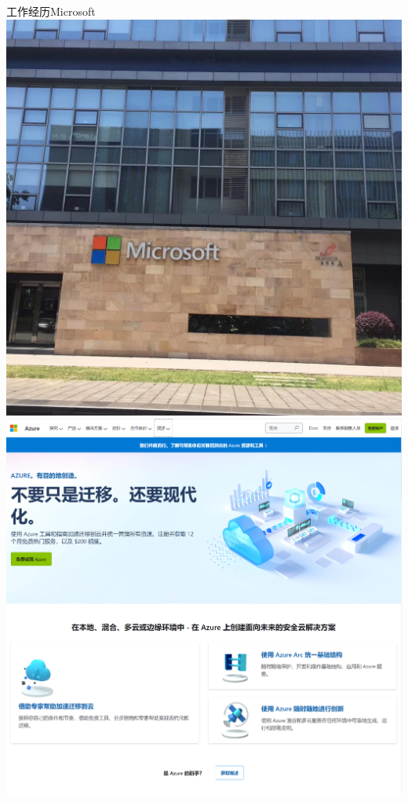 \documentclass[xcolor=svgnames, t, aspectratio=169]{ctexbeamer}
\begin{document}
\begin{frame}{工作经历}{Microsoft}
  \includegraphics[scale=0.14,trim=0 0 0 120,clip]{microsoft_css.jpg}
  \includegraphics[scale=0.2]{azure.png}
\end{frame}
\end{document}
